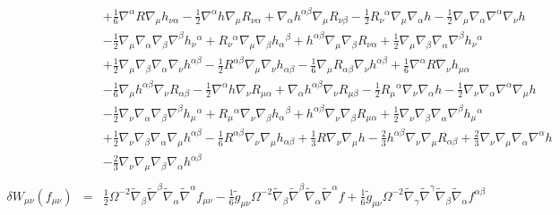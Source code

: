 \documentclass[10pt,letterpaper]{article}
\numberwithin{equation}{section}
\begin{document}
\begin{eqnarray}
&& + \tfrac{1}{6} \nabla^{\alpha }R \nabla_{\mu }h_{\nu \alpha } -  \tfrac{1}{2} \nabla^{\alpha }h \nabla_{\mu }R_{\nu \alpha } + \nabla_{\alpha }h^{\alpha \beta } \nabla_{\mu }R_{\nu \beta } -  \tfrac{1}{2} R_{\nu }{}^{\alpha } \nabla_{\mu }\nabla_{\alpha }h -  \tfrac{1}{2} \nabla_{\mu }\nabla_{\alpha }\nabla^{\alpha }\nabla_{\nu }h \nonumber \\ 
&& -  \tfrac{1}{2} \nabla_{\mu }\nabla_{\alpha }\nabla_{\beta }\nabla^{\beta }h_{\nu }{}^{\alpha } + R_{\nu }{}^{\alpha } \nabla_{\mu }\nabla_{\beta }h_{\alpha }{}^{\beta } + h^{\alpha \beta } \nabla_{\mu }\nabla_{\beta }R_{\nu \alpha } + \tfrac{1}{2} \nabla_{\mu }\nabla_{\beta }\nabla_{\alpha }\nabla^{\beta }h_{\nu }{}^{\alpha } \nonumber \\ 
&& + \tfrac{1}{2} \nabla_{\mu }\nabla_{\beta }\nabla_{\alpha }\nabla_{\nu }h^{\alpha \beta } -  \tfrac{1}{2} R^{\alpha \beta } \nabla_{\mu }\nabla_{\nu }h_{\alpha \beta } -  \tfrac{1}{6} \nabla_{\mu }R_{\alpha \beta } \nabla_{\nu }h^{\alpha \beta } + \tfrac{1}{6} \nabla^{\alpha }R \nabla_{\nu }h_{\mu \alpha } \nonumber \\ 
&& -  \tfrac{1}{6} \nabla_{\mu }h^{\alpha \beta } \nabla_{\nu }R_{\alpha \beta } -  \tfrac{1}{2} \nabla^{\alpha }h \nabla_{\nu }R_{\mu \alpha } + \nabla_{\alpha }h^{\alpha \beta } \nabla_{\nu }R_{\mu \beta } -  \tfrac{1}{2} R_{\mu }{}^{\alpha } \nabla_{\nu }\nabla_{\alpha }h -  \tfrac{1}{2} \nabla_{\nu }\nabla_{\alpha }\nabla^{\alpha }\nabla_{\mu }h \nonumber \\ 
&& -  \tfrac{1}{2} \nabla_{\nu }\nabla_{\alpha }\nabla_{\beta }\nabla^{\beta }h_{\mu }{}^{\alpha } + R_{\mu }{}^{\alpha } \nabla_{\nu }\nabla_{\beta }h_{\alpha }{}^{\beta } + h^{\alpha \beta } \nabla_{\nu }\nabla_{\beta }R_{\mu \alpha } + \tfrac{1}{2} \nabla_{\nu }\nabla_{\beta }\nabla_{\alpha }\nabla^{\beta }h_{\mu }{}^{\alpha } \nonumber \\ 
&& + \tfrac{1}{2} \nabla_{\nu }\nabla_{\beta }\nabla_{\alpha }\nabla_{\mu }h^{\alpha \beta } -  \tfrac{1}{6} R^{\alpha \beta } \nabla_{\nu }\nabla_{\mu }h_{\alpha \beta } + \tfrac{1}{3} R \nabla_{\nu }\nabla_{\mu }h -  \tfrac{2}{3} h^{\alpha \beta } \nabla_{\nu }\nabla_{\mu }R_{\alpha \beta } + \tfrac{2}{3} \nabla_{\nu }\nabla_{\mu }\nabla_{\alpha }\nabla^{\alpha }h \nonumber \\ 
&& -  \tfrac{2}{3} \nabla_{\nu }\nabla_{\mu }\nabla_{\beta }\nabla_{\alpha }h^{\alpha \beta }
\\ \nonumber\\
\delta W_{\mu\nu}(f_{\mu\nu})&=& \tfrac{1}{2} \Omega^{-2} \tilde{\nabla}_{\beta }\tilde{\nabla}^{\beta }\tilde{\nabla}_{\alpha }\tilde{\nabla}^{\alpha }f_{\mu \nu } -  \tfrac{1}{6} \tilde{g}_{\mu \nu } \Omega^{-2} \tilde{\nabla}_{\beta }\tilde{\nabla}^{\beta }\tilde{\nabla}_{\alpha }\tilde{\nabla}^{\alpha }f + \tfrac{1}{6} \tilde{g}_{\mu \nu } \Omega^{-2} \tilde{\nabla}_{\gamma }\tilde{\nabla}^{\gamma }\tilde{\nabla}_{\beta }\tilde{\nabla}_{\alpha }f^{\alpha \beta } \nonumber \\ 

\end{eqnarray}
\end{document}
